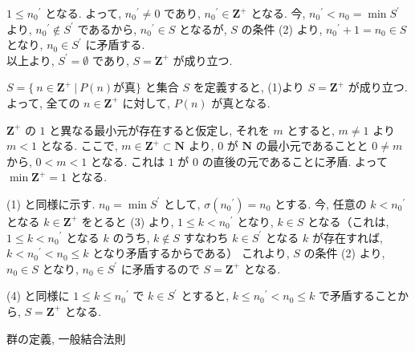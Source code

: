 \begin{nmprob}
{$1 \leq {n_0}^{'}$ となる. よって, ${n_0}^{'} \neq 0$ であり, ${n_0}^{'} \in \bm{Z}^+$ となる.
今, ${n_0}^{'} < n_0 = \min S^{'}$ より, ${n_0}^{'} \notin S^{'}$ であるから, ${n_0}^{'} \in S$ となるが, $S$ の条件 (2) より, ${n_0}^{'} + 1 = n_0 \in S$ となり, $n_0 \in S^{'}$ に矛盾する.\\
以上より, $S^{'} = \emptyset$ であり, $S = \bm{Z}^+$ が成り立つ.
\item $S =  \{\ n \in \bm{Z}^+\ |\ P(n) \text{が真} \}$ と集合 $S$ を定義すると, (1)より $S = \bm{Z}^+$ が成り立つ.
よって, 全ての $n \in \bm{Z}^+$ に対して, $P(n)$ が真となる.
\item $\bm{Z}^+$ の $1$ と異なる最小元が存在すると仮定し, それを $m$ とすると, $m \neq 1$ より $m < 1$ となる.
ここで, $m \in \bm{Z}^{+} \subset \bm{N}$ より, $0$ が $\bm{N}$ の最小元であることと $0 \neq m$ から, $0 < m < 1$ となる. これは $1$ が $0$ の直後の元であることに矛盾. よって $\min \bm{Z}^+ = 1$ となる.
\item (1) と同様に示す. $n_0 = \min S^{'}$ として, $\sigma ({n_0}^{'}) = n_0$ とする.
今, 任意の $k < {n_0}^{'}$ となる $k \in \bm{Z}^+$ をとると (3) より, $1 \leq k < {n_0}^{'}$ となり, $k \in S$ となる（これは, $1 \leq k < {n_0}^{'}$ となる $k$ のうち, $k \notin S$ すなわち $k \in S^{'}$ となる $k$ が存在すれば, $k < {n_0}^{'} < n_0 \leq k$ となり矛盾するからである）
これより, $S$ の条件 (2) より, $n_0 \in S$ となり, $n_0 \in S^{'}$ に矛盾するので $S = \bm{Z}^+$ となる.
\item (4) と同様に $1 \leq k \leq {n_0}^{'}$ で $k \in S^{'}$ とすると, $k \leq {n_0}^{'} < n_0 \leq k$ で矛盾することから, $S = \bm{Z}^+$ となる.
} 
\end{nmprob}



\begin{nmprob}
\makeatletter\tagsleft@true\makeatother
群の定義, 一般結合法則
\makeatletter\tagsleft@false\makeatother
\end{nmprob}